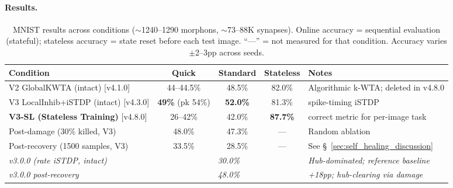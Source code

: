 \paragraph{Results.}
\begin{table}[h]
\centering
\caption{MNIST results across conditions ($\sim$1240--1290 morphons, $\sim$73--88K synapses). Online accuracy = sequential evaluation (stateful); stateless accuracy = state reset before each test image. ``---'' = not measured for that condition. Accuracy varies $\pm$2--3pp across seeds.}
\label{tab:mnist}
\small
\begin{tabular}{lcccp{3.4cm}}
\toprule
Condition & Quick & Standard & Stateless & Notes \\
\midrule
V2 GlobalKWTA (intact) [v4.1.0]          & 44--44.5\% & 48.5\%         & 82.0\% & Algorithmic k-WTA; deleted in v4.8.0 \\
V3 LocalInhib+iSTDP (intact) [v4.3.0]   & \textbf{49\%} (pk 54\%) & \textbf{52.0\%} & 81.3\% & spike-timing iSTDP \\
\textbf{V3-SL (Stateless Training)} [v4.8.0] & 26--42\%   & 42.0\%         & \textbf{87.7\%} & correct metric for per-image task \\
Post-damage (30\% killed, V3)            & 48.0\%    & 47.3\%          & ---    & Random ablation \\
Post-recovery (1500 samples, V3)         & 33.5\%    & 28.5\%          & ---    & See §~\ref{sec:self_healing_discussion} \\
\midrule
\textit{v3.0.0 (rate iSTDP, intact)} & \multicolumn{3}{c}{\textit{30.0\%}} & \textit{Hub-dominated; reference baseline} \\
\textit{v3.0.0 post-recovery}        & \multicolumn{3}{c}{\textit{48.0\%}} & \textit{+18pp; hub-clearing via damage} \\
\bottomrule
\end{tabular}
\end{table}

